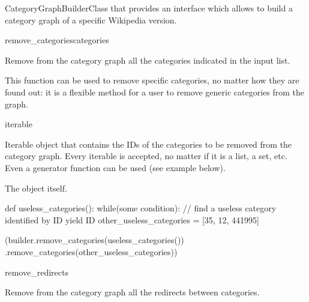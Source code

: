 \begin{classdoc}{CategoryGraphBuilder}{Class that provides an interface which allows to build a category graph of a specific Wikipedia version.}
\begin{classmethod}{remove\_categories}{categories}
                    \begin{functiondescription}
                        Remove from the category graph all the categories indicated in the input list.
                        
                        This function can be used to remove specific categories, no matter how they are found out: it is a flexible method for a user to remove generic categories from the graph.
                    \end{functiondescription}
                    
                    \begin{functionparameters}
                        \item[categories] iterable
                        
                        Iterable object that contains the IDs of the categories to be removed from the category graph. Every iterable is accepted, no matter if it is a list, a set, etc. Even a generator function can be used (see example below).
                    \end{functionparameters}
                    
                    \begin{functionoutput}
                        The  object itself.
                    \end{functionoutput}
                    
                    \begin{functionexample}
def useless_categories():
    while(some condition):
        // find a useless category identified by ID
        yield ID
other_useless_categories = [35, 12, 441995]

(builder.remove_categories(useless_categories())
        .remove_categories(other_useless_categories))
                    \end{functionexample}
                \end{classmethod}
                \item \begin{classmethod}{remove\_redirects}{}
                
                    \begin{functiondescription}
                        Remove from the category graph all the redirects between categories.
                        

\end{functiondescription}
\end{classmethod}
\end{classdoc}

